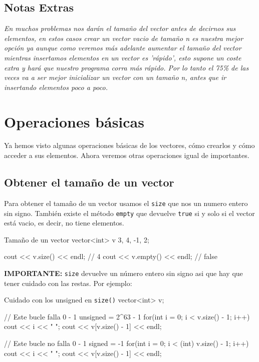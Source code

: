 \documentclass{article}
\begin{document}
    \subsection{Notas Extras}

    \textit{En muchos problemas nos darán el tamaño del vector antes de decirnos sus elementos, en estos casos crear un 
    vector vacio de tamaño n es nuestra mejor opción ya aunque como veremos más adelante aumentar el tamaño del vector mientras
    insertamos elementos en un vector es 'rápido', esto supone un coste extra y hará que nuestro programa corra más rápido. 
    Por lo tanto el 75\% de las veces  va a ser mejor inicializar un vector con un tamaño n, antes que ir insertando elementos poco a poco. }
    \pagebreak
    \section{Operaciones básicas}

    Ya hemos visto algunas operaciones básicas de los vectores, cómo crearlos y cómo acceder a sus elementos. Ahora veremos
    otras operaciones igual de importantes.

    \subsection{Obtener el tamaño de un vector}

    Para obtener el tamaño de un vector usamos el \texttt{size} que nos un numero entero sin signo. 
    También existe el método \texttt{empty} que devuelve \texttt{true} si y solo si el vector está 
    vacio, es decir, no tiene elementos.

    \begin{codelisting}{Tamaño de un vector}
    vector<int> v {3, 4, -1, 2};

    cout << v.size() << endl; // 4
    cout << v.empty() << endl; // false

    \end{codelisting}


    \textbf{IMPORTANTE:} \texttt{size} devuelve un número entero sin signo asi que hay que tener cuidado con las
    restas. Por ejemplo:

    \begin{codelisting}{Cuidado con los unsigned en \texttt{size()}}
vector<int> v;

// Este bucle falla 0 - 1 unsigned = 2^63 - 1
for(int i = 0; i < v.size() - 1; i++) {
    cout << i << " ";
}
cout << v[v.size() - 1] << endl;

// Este bucle no falla 0 - 1 signed = -1
for(int i = 0; i < (int) v.size() - 1; i++) {
    cout << i << " ";
}
cout << v[v.size() - 1] << endl;

\end{codelisting}
\end{document}
